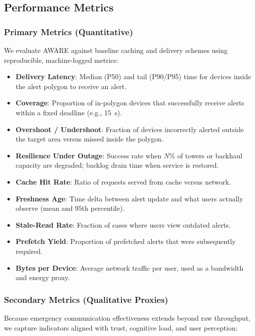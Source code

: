 \documentclass[11pt,twocolumn]{article}
\begin{document}
\subsection{Performance Metrics}

\subsubsection{Primary Metrics (Quantitative)}
We evaluate AWARE against baseline caching and delivery schemes using reproducible, machine-logged metrics:

\begin{itemize}
    \item \textbf{Delivery Latency}: Median (P50) and tail (P90/P95) time for devices inside the alert polygon to receive an alert.
    \item \textbf{Coverage}: Proportion of in-polygon devices that successfully receive alerts within a fixed deadline (e.g., 15~s).
    \item \textbf{Overshoot / Undershoot}: Fraction of devices incorrectly alerted outside the target area versus missed inside the polygon.
    \item \textbf{Resilience Under Outage}: Success rate when $N\%$ of towers or backhaul capacity are degraded; backlog drain time when service is restored.
    \item \textbf{Cache Hit Rate}: Ratio of requests served from cache versus network.
    \item \textbf{Freshness Age}: Time delta between alert update and what users actually observe (mean and 95th percentile).
    \item \textbf{Stale-Read Rate}: Fraction of cases where users view outdated alerts.
    \item \textbf{Prefetch Yield}: Proportion of prefetched alerts that were subsequently required.
    \item \textbf{Bytes per Device}: Average network traffic per user, used as a bandwidth and energy proxy.
\end{itemize}

\subsubsection{Secondary Metrics (Qualitative Proxies)}
Because emergency communication effectiveness extends beyond raw throughput, we capture indicators aligned with trust, cognitive load, and user perception:
\end{document}

